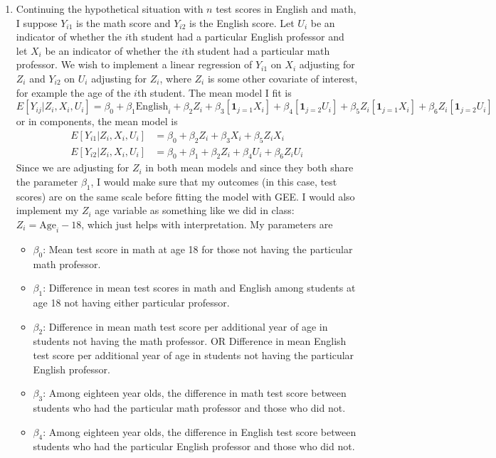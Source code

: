 \documentclass[11pt]{article}
\begin{document}
\begin{enumerate}
	\item Continuing the hypothetical situation with $n$ test scores in English and math, I suppose $Y_{i1}$ is the math score and $Y_{i2}$ is the English score. Let $U_i$ be an indicator of whether the $i$th student had a particular English professor and let $X_i$ be an indicator of whether the $i$th student had a particular math professor. We wish to implement a linear regression of $Y_{i1}$ on $X_i$ adjusting for $Z_i$ and $Y_{i2}$ on $U_i$ adjusting for $Z_i$, where $Z_i$ is some other covariate of interest, for example the age of the $i$th student. The mean model I fit is
		\[
			E[Y_{ij}|Z_i,X_i,U_i] = \beta_0 + \beta_1\mathrm{English}_i + \beta_2Z_i + \beta_3[\bm{1}_{j=1}X_i] + \beta_4[\bm{1}_{j=2}U_i] + \beta_5Z_i[\bm{1}_{j=1}X_i] + \beta_6Z_i[\bm{1}_{j=2}U_i]
		\]
		or in components, the mean model is
		\begin{align*}
			E[Y_{i1}|Z_i,X_i,U_i] &= \beta_0 + \beta_2 Z_i + \beta_3 X_i + \beta_5 Z_iX_i\\
			E[Y_{i2}|Z_i,X_i,U_i] &= \beta_0 + \beta_1 + \beta_2 Z_i + \beta_4 U_i + \beta_6 Z_iU_i
		\end{align*}
	Since we are adjusting for $Z_i$ in both mean models and since they both share the parameter $\beta_1$, I would make sure that my outcomes (in this case, test scores) are on the same scale before fitting the model with GEE. I would also implement my $Z_i$ age variable as something like we did in class: $Z_i = \mathrm{Age}_i-18$, which just helps with interpretation. My parameters are
	\begin{itemize}
		\item $\beta_0$: Mean test score in math at age 18 for those not having the particular math professor.
		\item $\beta_1$: Difference in mean test scores in math and English among students at age 18 not having either particular professor.
		\item $\beta_2$: Difference in mean math test score per additional year of age in students not having the math professor. OR Difference in mean English test score per additional year of age in students not having the particular English professor.
		\item $\beta_3$: Among eighteen year olds, the difference in math test score between students who had the particular math professor and those who did not.
		\item $\beta_4$: Among eighteen year olds, the difference in English test score between students who had the particular English professor and those who did not.

\end{itemize}
\end{enumerate}
\end{document}
